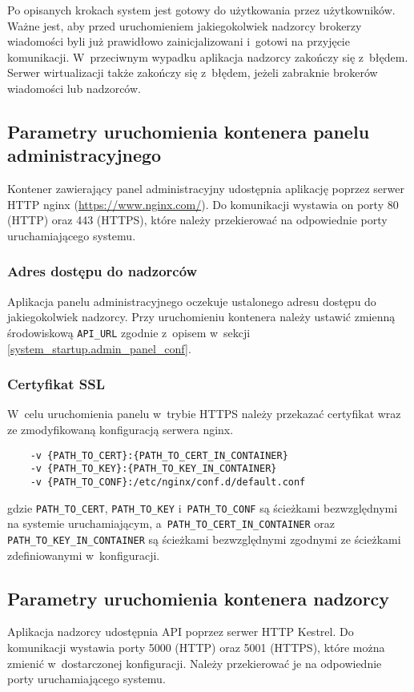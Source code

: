\documentclass[../opis-rozwiazania.tex]{subfiles}
\begin{document}
Po opisanych krokach system jest gotowy do użytkowania przez użytkowników.
Ważne jest, aby przed uruchomieniem jakiegokolwiek nadzorcy brokerzy wiadomości byli już prawidłowo zainicjalizowani i~gotowi na przyjęcie komunikacji.
W~przeciwnym wypadku aplikacja nadzorcy zakończy się z~błędem.
Serwer wirtualizacji także zakończy się z~błędem, jeżeli zabraknie brokerów wiadomości lub nadzorców.

\subsection{Parametry uruchomienia kontenera panelu administracyjnego}
Kontener zawierający panel administracyjny udostępnia aplikację poprzez serwer HTTP nginx (\url{https://www.nginx.com/}).
Do komunikacji wystawia on porty 80 (HTTP) oraz 443 (HTTPS), które należy przekierować na odpowiednie porty uruchamiającego systemu.

\subsubsection{Adres dostępu do nadzorców}
Aplikacja panelu administracyjnego oczekuje ustalonego adresu dostępu do jakiegokolwiek nadzorcy.
Przy uruchomieniu kontenera należy ustawić zmienną środowiskową \texttt{API\_URL} zgodnie z~opisem w~sekcji \ref{system_startup.admin_panel_conf}.

\subsubsection{Certyfikat SSL}
W~celu uruchomienia panelu w~trybie HTTPS należy przekazać certyfikat wraz ze zmodyfikowaną konfiguracją serwera nginx.
\begin{verbatim}
	-v {PATH_TO_CERT}:{PATH_TO_CERT_IN_CONTAINER}
	-v {PATH_TO_KEY}:{PATH_TO_KEY_IN_CONTAINER}
	-v {PATH_TO_CONF}:/etc/nginx/conf.d/default.conf
\end{verbatim}
gdzie \texttt{PATH\_TO\_CERT}, \texttt{PATH\_TO\_KEY} i~\texttt{PATH\_TO\_CONF} są ścieżkami bezwzględnymi na systemie uruchamiającym, a~\texttt{PATH\_TO\_CERT\_IN\_CONTAINER} oraz \texttt{PATH\_TO\_KEY\_IN\_CONTAINER} są ścieżkami bezwzględnymi zgodnymi ze ścieżkami zdefiniowanymi w~konfiguracji.

\subsection{Parametry uruchomienia kontenera nadzorcy}
Aplikacja nadzorcy udostępnia API poprzez serwer HTTP Kestrel.
Do komunikacji wystawia porty 5000 (HTTP) oraz 5001 (HTTPS), które można zmienić w~dostarczonej konfiguracji.
Należy przekierować je na odpowiednie porty uruchamiającego systemu.
\end{document}

